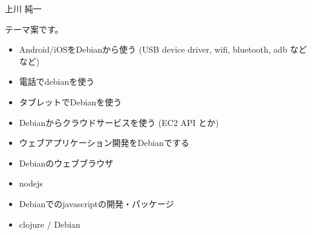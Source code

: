 
\begin{prework}{上川 純一}

テーマ案です。

\begin{itemize}
 \item Android/iOSをDebianから使う (USB device driver, wifi, bluetooth,
       adb などなど)
 \item 電話でdebianを使う
 \item タブレットでDebianを使う
 \item Debianからクラウドサービスを使う (EC2 API とか)
 \item ウェブアプリケーション開発をDebianでする
 \item Debianのウェブブラウザ
 \item nodejs
 \item Debianでのjavascriptの開発・パッケージ
 \item clojure / Debian
\end{itemize}
 
\end{prework}


